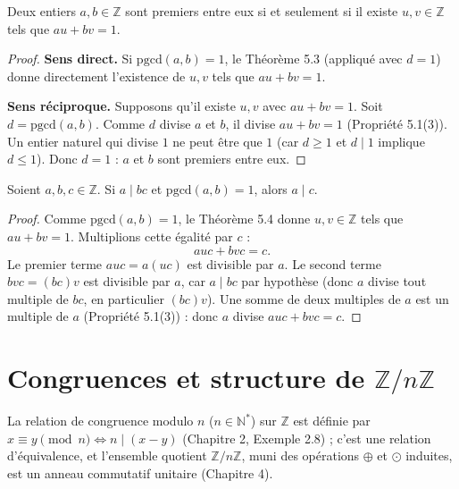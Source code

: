 \documentclass[a4paper,12pt,openany]{book}
\begin{document}
\begin{theoreme}
Deux entiers $a,b\in\mathbb{Z}$ sont premiers entre eux si et seulement si
il existe $u,v\in\mathbb{Z}$ tels que $au+bv=1$.
\end{theoreme}

\begin{proof}
\textbf{Sens direct.} Si $\mathrm{pgcd}(a,b)=1$, le Théorème 5.3 (appliqué
avec $d=1$) donne directement l'existence de $u,v$ tels que $au+bv=1$.

\textbf{Sens réciproque.} Supposons qu'il existe $u,v$ avec $au+bv=1$.
Soit $d=\mathrm{pgcd}(a,b)$. Comme $d$ divise $a$ et $b$, il divise
$au+bv=1$ (Propriété 5.1(3)). Un entier naturel qui divise $1$ ne peut
être que $1$ (car $d\geq1$ et $d\mid1$ implique $d\leq1$). Donc $d=1$ :
$a$ et $b$ sont premiers entre eux.
\end{proof}

\begin{theoreme}
Soient $a,b,c\in\mathbb{Z}$. Si $a\mid bc$ et $\mathrm{pgcd}(a,b)=1$, alors
$a\mid c$.
\end{theoreme}

\begin{proof}
Comme $\mathrm{pgcd}(a,b)=1$, le Théorème 5.4 donne $u,v\in\mathbb{Z}$
tels que $au+bv=1$. Multiplions cette égalité par $c$ :
\[
auc + bvc = c.
\]
Le premier terme $auc = a(uc)$ est divisible par $a$. Le second terme
$bvc = (bc)v$ est divisible par $a$, car $a\mid bc$ par hypothèse (donc
$a$ divise tout multiple de $bc$, en particulier $(bc)v$). Une somme de
deux multiples de $a$ est un multiple de $a$ (Propriété 5.1(3)) : donc $a$
divise $auc+bvc=c$.
\end{proof}


\section{Congruences et structure de \texorpdfstring{$\mathbb{Z}/n\mathbb{Z}$}{Z/nZ}}


\begin{remarque}[Rappel]
La relation de congruence modulo $n$ ($n\in\mathbb{N}^*$) sur
$\mathbb{Z}$ est définie par $x\equiv y \pmod n \iff n \mid (x-y)$
(Chapitre 2, Exemple 2.8) ; c'est une relation d'équivalence, et l'ensemble
quotient $\mathbb{Z}/n\mathbb{Z}$, muni des opérations $\oplus$ et
$\odot$ induites, est un anneau commutatif unitaire (Chapitre 4).
\end{remarque}
\end{document}
